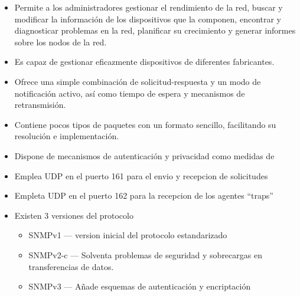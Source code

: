 \documentclass[letterpaper]{article}
\begin{document}
\begin{itemize}
  \item  Permite a los administradores gestionar el rendimiento de la red, buscar y
modificar la información de los dispositivos que la componen, encontrar y
diagnosticar problemas en la red, planificar su crecimiento y generar
informes sobre los nodos de la red.
  \item Es capaz de gestionar eficazmente dispositivos de diferentes fabricantes.

  \item Ofrece una simple combinación de solicitud-respuesta y un modo de
notificación activo, así como tiempo de espera y mecanismos de
retransmisión.

  \item Contiene pocos tipos de paquetes con un formato sencillo, facilitando su
resolución e implementación.
  \item Dispone de mecanismos de autenticación y privacidad como medidas de
  \item Emplea UDP en el puerto 161 para el envio y recepcion de solicitudes
  \item Empleta UDP en el puerto 162 para la recepcion de los agentes ``traps''
  \item Existen 3 versiones del protocolo
  \begin{itemize}
    \item SNMPv1 --- version inicial del protocolo estandarizado
    \item SNMPv2-c --- Solventa problemas de seguridad y sobrecargas en transferencias de datos.
    \item SNMPv3 --- Añade esquemas de autenticación y encriptación
  \end{itemize}
\end{itemize}
\end{document}

